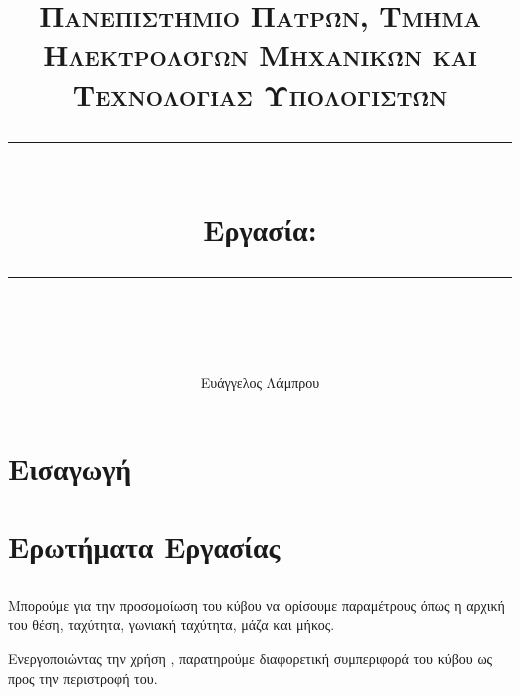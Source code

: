 \documentclass[11pt]{scrartcl} %
\title{	
	\normalfont\normalsize
	\textsc{Πανεπιστήμιο Πατρών, Τμήμα Ηλεκτρολόγων Μηχανικών και Τεχνολογίας Υπολογιστών}\\ %
	\vspace{25pt} %
	\rule{\linewidth}{0.5pt}\\ %
	\vspace{20pt} %
	{\Large Εργασία: \en{Pokemon}}\\ %
	\vspace{12pt} %
	\rule{\linewidth}{2pt}\\ %
	\vspace{12pt} %
}
\author{\LARGE Ευάγγελος Λάμπρου \\ \en{UP1066519}} %
\date{} %
\begin{document}
\maketitle 

\tableofcontents

\newpage

\section{Εισαγωγή}

\section{Ερωτήματα Εργασίας}

\subsection{}
\subsubsection{}

Μπορούμε για την προσομοίωση του κύβου να ορίσουμε παραμέτρους όπως η αρχική του θέση, ταχύτητα, 
γωνιακή ταχύτητα, μάζα και μήκος. 

Ενεργοποιώντας την χρήση , παρατηρούμε διαφορετική συμπεριφορά του κύβου ως προς την περιστροφή του.
\end{document}
